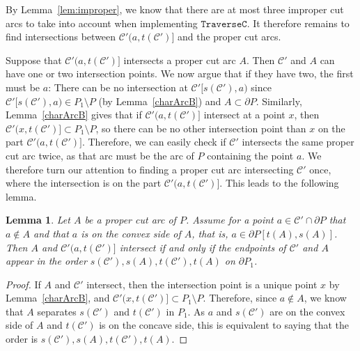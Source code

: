 \documentclass{article}
\newcommand{\ttt}[1]{\texttt{#1}}
\newcommand{\PP}{P}
\newcommand{\cut}{\mathcal C}
\newcommand{\start}{s}
\newcommand{\terminal}{t}
\newcommand{\arcA}{A}
\newtheorem{lemma}[theorem]{Lemma}
\begin{document}
By Lemma~\ref{lem:improper}, we know that there are at most three improper cut arcs to take into account when implementing $\ttt{TraverseC}$.
It therefore remains to find intersections between $\cut'(a,\terminal(\cut')]$ and the proper cut arcs.

Suppose that $\cut'(a,\terminal(\cut')]$ intersects a proper cut arc $\arcA$.
Then $\cut'$ and $\arcA$ can have one or two intersection points.
We now argue that if they have two, the first must be $a$: There can be no intersection at $\cut'[\start(\cut'),a)$ since $\cut'[\start(\cut'),a)\in\PP_1\setminus\PP$ (by Lemma~\ref{charArcB}) and $\arcA\subset\partial\PP$.
Similarly, Lemma~\ref{charArcB} gives that if $\cut'(a,\terminal(\cut')]$ intersect at a point $x$, then $\cut'(x,\terminal(\cut')]\subset\PP_1\setminus\PP$, so there can be no other intersection point than $x$ on the part $\cut'(a,\terminal(\cut')]$.
Therefore, we can easily check if $\cut'$ intersects the same proper cut arc twice, as that arc must be the arc of $\PP$ containing the point $a$.
We therefore turn our attention to finding a proper cut arc intersecting $\cut'$ once, where the intersection is on the part $\cut'(a,\terminal(\cut')]$.
This leads to the following lemma.

\begin{lemma}\label{charArcB2}
Let $\arcA$ be a proper cut arc of $\PP$.
Assume for a point $a\in\cut'\cap\partial\PP$ that $a\notin\arcA$ and that $a$ is on the convex side of $\arcA$, that is, $a\in \partial\PP[\terminal(\arcA),\start(\arcA)]$.
Then $\arcA$ and $\cut'(a,\terminal(\cut')]$ intersect if and only if the endpoints of $\cut'$ and $\arcA$ appear in the order $\start(\cut'),\start(\arcA),\terminal(\cut'),\terminal(\arcA)$ on $\partial\PP_1$.
\end{lemma}

\begin{proof}
If $\arcA$ and $\cut'$ intersect, then the intersection point is a unique point $x$ by Lemma~\ref{charArcB}, and $\cut'(x,\terminal(\cut')]\subset\PP_1\setminus\PP$.
Therefore, since $a\notin\arcA$, we know that $\arcA$ separates $\start(\cut')$ and $\terminal(\cut')$ in $\PP_1$.
As $a$ and $\start(\cut')$ are on the convex side of $\arcA$ and $\terminal(\cut')$ is on the concave side, this is equivalent to saying that the order is $\start(\cut'),\start(\arcA),\terminal(\cut'),\terminal(\arcA)$.
\end{proof}
\end{document}

